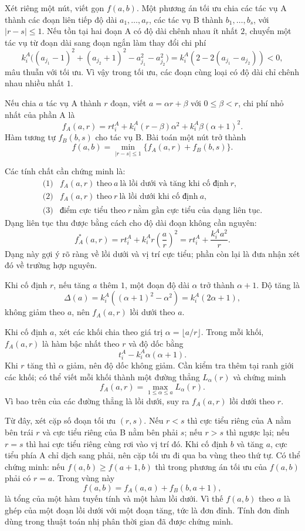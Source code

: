 \documentclass[11pt]{article}
\begin{document}
Xét riêng một nút, viết gọn $f(a,b)$. Một phương án tối ưu chia các tác vụ A
thành các đoạn liên tiếp độ dài $a_1,\ldots,a_r$, các tác vụ B thành
$b_1,\ldots,b_s$, với $|r-s|\le 1$. Nếu tồn tại hai đoạn A có độ dài chênh nhau
ít nhất $2$, chuyển một tác vụ từ đoạn dài sang đoạn ngắn làm thay đổi chi phí
\[
  k_i^A\big((a_{j_1}-1)^2+(a_{j_2}+1)^2-a_{j_1}^2-a_{j_2}^2\big)
  =k_i^A(2-2(a_{j_1}-a_{j_2}))<0,
\]
mâu thuẫn với tối ưu. Vì vậy trong tối ưu, các đoạn cùng loại có độ dài chỉ
chênh nhau nhiều nhất $1$.

Nếu chia $a$ tác vụ A thành $r$ đoạn, viết $a=\alpha r+\beta$ với
$0\le\beta<r$, chi phí nhỏ nhất của phần A là
\[
  f_A(a,r)=r t_i^A+k_i^A(r-\beta)\alpha^2
  +k_i^A\beta(\alpha+1)^2.
\]
Hàm tương tự $f_B(b,s)$ cho tác vụ B. Bài toán một nút trở thành
\[
  f(a,b)=\min_{|r-s|\le 1}\{f_A(a,r)+f_B(b,s)\}.
\]

Các tính chất cần chứng minh là:
\[
\begin{array}{ll}
\text{(1)} & f_A(a,r)\ \text{theo}\ a\ \text{là lồi dưới và tăng khi cố định}\ r,\\
\text{(2)} & f_A(a,r)\ \text{theo}\ r\ \text{là lồi dưới khi cố định}\ a,\\
\text{(3)} & \text{điểm cực tiểu theo}\ r\ \text{nằm gần cực tiểu của dạng liên tục}.
\end{array}
\]
Dạng liên tục thu được bằng cách cho độ dài đoạn không cần nguyên:
\[
  f_A^*(a,r)=r t_i^A+k_i^A r\left(\frac ar\right)^2
  =r t_i^A+\frac{k_i^A a^2}{r}.
\]
Dạng này gợi ý rõ ràng về lồi dưới và vị trí cực tiểu; phần còn lại là đưa
nhận xét đó về trường hợp nguyên.

Khi cố định $r$, nếu tăng $a$ thêm $1$, một đoạn độ dài $\alpha$ trở thành
$\alpha+1$. Độ tăng là
\[
  \Delta(a)=k_i^A((\alpha+1)^2-\alpha^2)=k_i^A(2\alpha+1),
\]
không giảm theo $a$, nên $f_A(a,r)$ lồi dưới theo $a$.

Khi cố định $a$, xét các khối chia theo giá trị $\alpha=\lfloor a/r\rfloor$.
Trong mỗi khối, $f_A(a,r)$ là hàm bậc nhất theo $r$ và độ dốc bằng
\[
  t_i^A-k_i^A\alpha(\alpha+1).
\]
Khi $r$ tăng thì $\alpha$ giảm, nên độ dốc không giảm. Cần kiểm tra thêm tại
ranh giới các khối; có thể viết mỗi khối thành một đường thẳng $L_\alpha(r)$
và chứng minh
\[
  f_A(a,r)=\max_{1\le \alpha\le a} L_\alpha(r).
\]
Vì bao trên của các đường thẳng là lồi dưới, suy ra $f_A(a,r)$ lồi dưới theo
$r$.

Từ đây, xét cặp số đoạn tối ưu $(r,s)$. Nếu $r<s$ thì cực tiểu riêng của A nằm
bên trái $r$ và cực tiểu riêng của B nằm bên phải $s$; nếu $r>s$ thì ngược lại;
nếu $r=s$ thì hai cực tiểu riêng cùng rơi vào vị trí đó. Khi cố định $b$ và
tăng $a$, cực tiểu phía A chỉ dịch sang phải, nên cặp tối ưu đi qua ba vùng
theo thứ tự. Có thể chứng minh: nếu $f(a,b)\ge f(a+1,b)$ thì trong phương án
tối ưu của $f(a,b)$ phải có $r=a$. Trong vùng này
\[
  f(a,b)=f_A(a,a)+f_B(b,a+1),
\]
là tổng của một hàm tuyến tính và một hàm lồi dưới. Vì thế $f(a,b)$ theo $a$
là ghép của một đoạn lồi dưới với một đoạn tăng, tức là đơn đỉnh. Tính đơn
đỉnh dùng trong thuật toán nhị phân thời gian đã được chứng minh.
\end{document}
